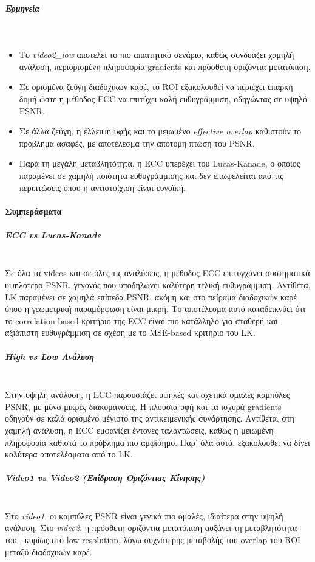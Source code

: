 \documentclass[12pt]{article}
\begin{document}
\subparagraph{Ερμηνεία}
\mbox{}\\
\begin{itemize}
    \item Το \textit{video2\_low} αποτελεί το πιο απαιτητικό σενάριο, καθώς συνδυάζει χαμηλή ανάλυση, περιορισμένη πληροφορία gradients και πρόσθετη οριζόντια μετατόπιση.
    \item Σε ορισμένα ζεύγη διαδοχικών καρέ, το ROI εξακολουθεί να περιέχει επαρκή δομή ώστε η μέθοδος ECC να επιτύχει καλή ευθυγράμμιση, οδηγώντας σε υψηλό PSNR.
    \item Σε άλλα ζεύγη, η έλλειψη υφής και το μειωμένο \textit{effective overlap} καθιστούν το πρόβλημα ασαφές, με αποτέλεσμα την απότομη πτώση του PSNR.
    \item Παρά τη μεγάλη μεταβλητότητα, η ECC υπερέχει του Lucas-Kanade, ο οποίος παραμένει σε χαμηλή ποιότητα ευθυγράμμισης και δεν επωφελείται από τις περιπτώσεις όπου η αντιστοίχιση είναι ευνοϊκή.
\end{itemize}

\paragraph{Συμπεράσματα}
\subparagraph{ECC vs Lucas-Kanade}
\mbox{}\\
Σε όλα τα videos και σε όλες τις αναλύσεις, η μέθοδος ECC επιτυγχάνει συστηματικά υψηλότερο PSNR, γεγονός που υποδηλώνει καλύτερη τελική ευθυγράμμιση.
Αντίθετα, LK παραμένει σε χαμηλά επίπεδα PSNR, ακόμη και στο πείραμα διαδοχικών καρέ όπου η γεωμετρική παραμόρφωση είναι μικρή. 
Το αποτέλεσμα αυτό καταδεικνύει ότι το correlation-based κριτήριο της ECC είναι πιο κατάλληλο για σταθερή και αξιόπιστη ευθυγράμμιση σε σχέση με το
MSE-based κριτήριο του LK.

\subparagraph{High vs Low Ανάλυση}
\mbox{}\\
Στην υψηλή ανάλυση, η ECC παρουσιάζει υψηλές και σχετικά ομαλές καμπύλες PSNR, με μόνο μικρές διακυμάνσεις. 
Η πλούσια υφή και τα ισχυρά gradients οδηγούν σε καλά ορισμένο μέγιστο της αντικειμενικής συνάρτησης. 
Αντίθετα, στη χαμηλή ανάλυση, η ECC εμφανίζει έντονες ταλαντώσεις, καθώς η μειωμένη πληροφορία καθιστά το πρόβλημα πιο αμφίσημο.
Παρ’ όλα αυτά, εξακολουθεί να δίνει  καλύτερα αποτελέσματα από το LK.

\subparagraph{Video1 vs Video2 (Επίδραση Οριζόντιας Κίνησης)}
\mbox{}\\
Στο \textit{video1}, οι καμπύλες PSNR είναι γενικά πιο ομαλές, ιδιαίτερα στην υψηλή ανάλυση. Στο \textit{video2}, η πρόσθετη οριζόντια μετατόπιση 
αυξάνει τη μεταβλητότητα του , κυρίως στο low resolution, λόγω συχνότερης μεταβολής του overlap του ROI μεταξύ διαδοχικών καρέ.
\end{document}
